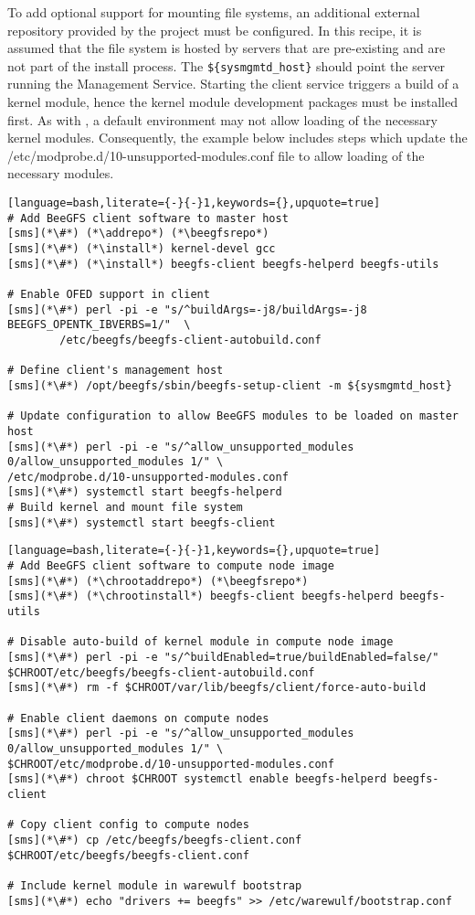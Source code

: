 To add optional support for mounting \beegfs{} file systems, an 
additional external \pkgmgr{} repository provided by the \beegfs{} project must be 
configured.  In this recipe, it is
assumed that the file system is hosted by servers that are pre-existing
and are not part of the install process. The \texttt{\$\{sysmgmtd\_host\}} should
point the server running the \beegfs{} Management Service. Starting the client service triggers
a build of a kernel module, hence the kernel module development packages must be
installed first. As with \Lustre{}, a default \baseOS{} environment may not allow 
loading of the necessary \beegfs{} kernel modules. Consequently, the example below 
includes steps which update the /etc/modprobe.d/10-unsupported-modules.conf file 
to allow loading of the necessary modules.

\begin{lstlisting}[language=bash,literate={-}{-}1,keywords={},upquote=true]
# Add BeeGFS client software to master host
[sms](*\#*) (*\addrepo*) (*\beegfsrepo*)
[sms](*\#*) (*\install*) kernel-devel gcc
[sms](*\#*) (*\install*) beegfs-client beegfs-helperd beegfs-utils

# Enable OFED support in client
[sms](*\#*) perl -pi -e "s/^buildArgs=-j8/buildArgs=-j8 BEEGFS_OPENTK_IBVERBS=1/"  \
        /etc/beegfs/beegfs-client-autobuild.conf

# Define client's management host
[sms](*\#*) /opt/beegfs/sbin/beegfs-setup-client -m ${sysmgmtd_host}

# Update configuration to allow BeeGFS modules to be loaded on master host
[sms](*\#*) perl -pi -e "s/^allow_unsupported_modules 0/allow_unsupported_modules 1/" \
/etc/modprobe.d/10-unsupported-modules.conf
[sms](*\#*) systemctl start beegfs-helperd
# Build kernel and mount file system
[sms](*\#*) systemctl start beegfs-client
\end{lstlisting}

\begin{lstlisting}[language=bash,literate={-}{-}1,keywords={},upquote=true]
# Add BeeGFS client software to compute node image
[sms](*\#*) (*\chrootaddrepo*) (*\beegfsrepo*)
[sms](*\#*) (*\chrootinstall*) beegfs-client beegfs-helperd beegfs-utils

# Disable auto-build of kernel module in compute node image
[sms](*\#*) perl -pi -e "s/^buildEnabled=true/buildEnabled=false/" $CHROOT/etc/beegfs/beegfs-client-autobuild.conf
[sms](*\#*) rm -f $CHROOT/var/lib/beegfs/client/force-auto-build

# Enable client daemons on compute nodes
[sms](*\#*) perl -pi -e "s/^allow_unsupported_modules 0/allow_unsupported_modules 1/" \
$CHROOT/etc/modprobe.d/10-unsupported-modules.conf
[sms](*\#*) chroot $CHROOT systemctl enable beegfs-helperd beegfs-client

# Copy client config to compute nodes
[sms](*\#*) cp /etc/beegfs/beegfs-client.conf $CHROOT/etc/beegfs/beegfs-client.conf

# Include kernel module in warewulf bootstrap
[sms](*\#*) echo "drivers += beegfs" >> /etc/warewulf/bootstrap.conf
\end{lstlisting}
